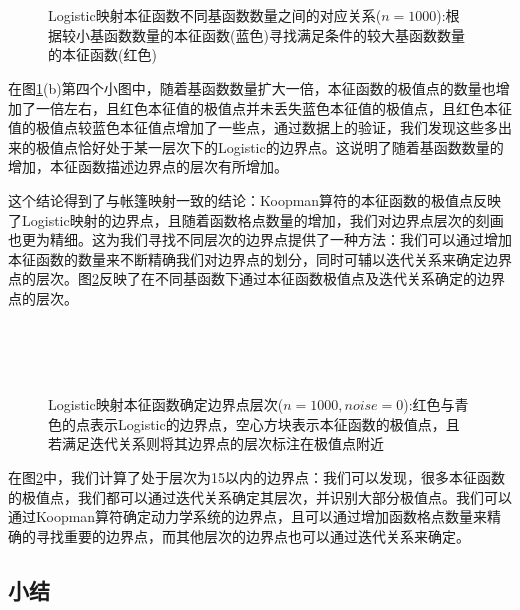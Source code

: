 \begin{figure}[!]
  \centering
    \\
    \\
  \caption[Logistic映射本征函数不同基函数数量之间的对应关系]{Logistic映射本征函数不同基函数数量之间的对应关系($n=1000$):根据较小基函数数量的本征函数(蓝色)寻找满足条件的较大基函数数量的本征函数(红色)}\label{fig:Logistic_findeigen_m8m16}
\end{figure}

在图\ref{fig:Logistic_findeigen_m8m16}(b)第四个小图中，随着基函数数量扩大一倍，本征函数的极值点的数量也增加了一倍左右，且红色本征值的极值点并未丢失蓝色本征值的极值点，且红色本征值的极值点较蓝色本征值点增加了一些点，通过数据上的验证，我们发现这些多出来的极值点恰好处于某一层次下的Logistic的边界点。这说明了随着基函数数量的增加，本征函数描述边界点的层次有所增加。

这个结论得到了与帐篷映射一致的结论：Koopman算符的本征函数的极值点反映了Logistic映射的边界点，且随着函数格点数量的增加，我们对边界点层次的刻画也更为精细。这为我们寻找不同层次的边界点提供了一种方法：我们可以通过增加本征函数的数量来不断精确我们对边界点的划分，同时可辅以迭代关系来确定边界点的层次。图\ref{fig:Logistic_auto_level_n1000_m4}反映了在不同基函数下通过本征函数极值点及迭代关系确定的边界点的层次。

\begin{figure}[!]
  \centering
    \\
    \\
    \\
  \caption[Logistic映射本征函数确定边界点层次]{Logistic映射本征函数确定边界点层次($n=1000,noise=0$):红色与青色的点表示Logistic的边界点，空心方块表示本征函数的极值点，且若满足迭代关系则将其边界点的层次标注在极值点附近}\label{fig:Logistic_auto_level_n1000_m4}
\end{figure}
在图\ref{fig:Logistic_auto_level_n1000_m4}中，我们计算了处于层次为15以内的边界点：我们可以发现，很多本征函数的极值点，我们都可以通过迭代关系确定其层次，并识别大部分极值点。我们可以通过Koopman算符确定动力学系统的边界点，且可以通过增加函数格点数量来精确的寻找重要的边界点，而其他层次的边界点也可以通过迭代关系来确定。

\subsection{小结}



